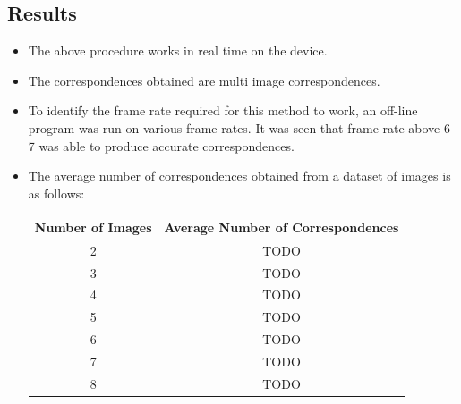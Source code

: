\documentclass{article}
\begin{document}
		\subsection{Results}
			\begin{itemize}
				\item The above procedure works in real time on the device.
				\item The correspondences obtained are multi image correspondences. 
				\item To identify the frame rate required for this method to work, an off-line program was run on various frame rates. It was seen that frame rate above 6-7 was able to produce accurate correspondences.
				\item The average number of correspondences obtained from a dataset of images is as follows: \\ 
					\begin{center}
 					\begin{tabular}{|c | c|}
 						\hline
 						Number of Images & Average Number of Correspondences \\ \hline
 						2 & TODO \\ \hline
 						3 & TODO \\ \hline
 						4 & TODO \\ \hline
 						5 & TODO \\ \hline
 						6 & TODO \\ \hline
 						7 & TODO \\ \hline
 						8 & TODO \\ \hline


\end{tabular}
\end{center}
\end{itemize}
\end{document}
